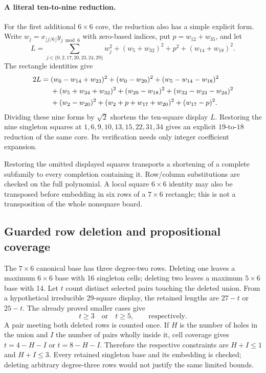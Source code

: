 \documentclass[11pt,a4paper]{article}
\theoremstyle{definition}
\begin{document}
\begin{samepage}
\paragraph{A literal ten-to-nine reduction.}
For the first additional $6\times6$ core, the reduction also has a simple
explicit form. Write $w_j=x_{\lfloor j/6\rfloor}y_{j\bmod6}$ with
zero-based indices, put $p=w_{12}+w_{35}$, and let
\[
 L=\sum_{j\in\{0,2,17,20,23,24,29\}}w_j^2
   +(w_5+w_{32})^2+p^2+(w_{14}+w_{18})^2.
\]
The rectangle identities give
\begin{align}\label{eq:explicitcore}
 2L={}&(w_0-w_{14}+w_{23})^2+(w_0-w_{29})^2
       +(w_5-w_{14}-w_{18})^2\notag\\
 &+(w_5+w_{24}+w_{32})^2+(w_{29}-w_{18})^2
       +(w_{32}-w_{23}-w_{24})^2\notag\\
 &+(w_2-w_{20})^2+(w_2+p+w_{17}+w_{20})^2+(w_{17}-p)^2.
\end{align}
Dividing these nine forms by $\sqrt2$ shortens the ten-square display
$L$. Restoring the nine singleton squares at
$1,6,9,10,13,15,22,31,34$ gives an explicit $19$-to-$18$ reduction
of the same core. Its verification needs only integer coefficient
expansion. 
\end{samepage}

Restoring the omitted displayed squares transports a shortening of a
complete subfamily to every completion containing it. Row/column
substitutions are checked on the full polynomial. A local square
$6\times6$ identity may also be transposed before embedding in six
rows of a $7\times6$ rectangle; this is not a transposition of the
whole nonsquare board.

\subsection{Guarded row deletion and propositional coverage}

The $7\times6$ canonical base has three degree-two rows. Deleting one
leaves a maximum $6\times6$ base with 16 singleton cells; deleting two
leaves a maximum $5\times6$ base with 14. Let $t$ count distinct selected
pairs touching the deleted union. From a hypothetical irreducible
29-square display, the retained lengths are $27-t$ or $25-t$.
The already proved smaller cases give
\begin{equation}\label{eq:deletioncuts}
 t\ge3\quad\text{or}\quad t\ge5,
 \qquad\text{respectively}.
\end{equation}
A pair meeting both deleted rows is counted once. If $H$ is the number
of holes in the union and $I$ the number of pairs wholly inside it,
cell coverage gives $t=4-H-I$ or $t=8-H-I$. Therefore the respective
constraints are $H+I\le1$ and $H+I\le3$. Every retained singleton base
and its embedding is checked; deleting arbitrary degree-three rows
would not justify the same limited bounds.
\end{document}
